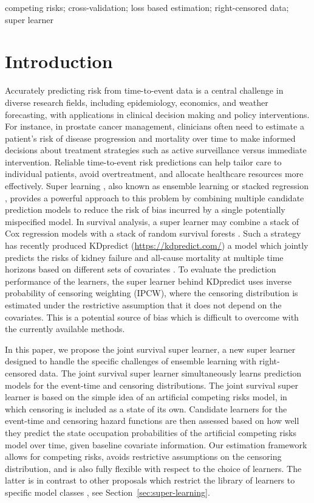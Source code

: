 \documentclass[lineno]{biometrika}
\newcommand{\1}{\mathds{1}}
\begin{document}
\begin{keywords}
competing risks; cross-validation; loss based estimation; right-censored data; super learner
\end{keywords}

\section{Introduction}
\label{sec:introduction}

Accurately predicting risk from time-to-event data is a central
challenge in diverse research fields, including epidemiology,
economics, and weather forecasting, with applications in clinical
decision making and policy interventions. For instance, in prostate
cancer management, clinicians often need to estimate a patient’s risk
of disease progression and mortality over time to make informed
decisions about treatment strategies such as active surveillance
versus immediate intervention. Reliable time-to-event risk predictions
can help tailor care to individual patients, avoid overtreatment, and
allocate healthcare resources more effectively. Super learning
\citep{van2007super}, also known as ensemble learning or stacked
regression \citep{wolpert1992stacked,breiman1996stacked}, provides a
powerful approach to this problem by combining multiple candidate
prediction models to reduce the risk of bias incurred by a single
potentially mispecified model. In survival analysis, a super learner
may combine a stack of Cox regression models with a stack of random
survival forests \citep[][Section 8.4]{gerds2021medical}. Such a
strategy has recently produced KDpredict
(\url{https://kdpredict.com/}) a model which jointly predicts the
risks of kidney failure and all-cause mortality at multiple time
horizons based on different sets of covariates
\citep{liu2024predicting}. To evaluate the prediction performance of
the learners, the super learner behind KDpredict uses inverse
probability of censoring weighting (IPCW), where the censoring
distribution is estimated under the restrictive assumption that it
does not depend on the covariates. This is a potential source of bias
which is difficult to overcome with the currently available methods.

In this paper, we propose the joint survival super learner, a new
super learner designed to handle the specific challenges of ensemble
learning with right-censored data. The joint survival super learner
simultaneously learns prediction models for the event-time and
censoring distributions. The joint survival super learner is based on
the simple idea of an artificial competing risks model, in which
censoring is included as a state of its own. Candidate learners for the
event-time and censoring hazard functions are then assessed based on
how well they predict the state occupation probabilities of the
artificial competing risks model over time, given baseline
covariate information. Our estimation framework allows for competing
risks, avoids restrictive assumptions on the censoring distribution,
and is also fully flexible with respect to the choice of learners. The
latter is in contrast to other proposals which restrict the library of
learners to specific model classes
\citep{polley2011-sl-cens,golmakani2020super}, see
Section~\ref{sec:super-learning}.
\end{document}
